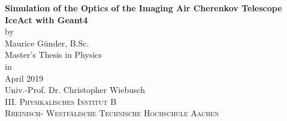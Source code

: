 \begin{titlepage}
\addtolength{\oddsidemargin}{4mm}
\begin{center}

\LARGE
\textbf{Simulation of the Optics of the Imaging Air Cherenkov Telescope IceAct with Geant4} \\[15mm]

{\large by}\\[1mm]
\Large
Maurice Günder, B.Sc.\\[18mm]

Master's Thesis in Physics\\[70mm]

{\large in}\\[1mm]
April 2019\\[35mm]

Univ.-Prof. Dr. Christopher Wiebusch \\\textsc{III. Physikalisches Institut B \\Rheinisch- Westfälische Technische Hochschule Aachen}

\end{center}
\end{titlepage}